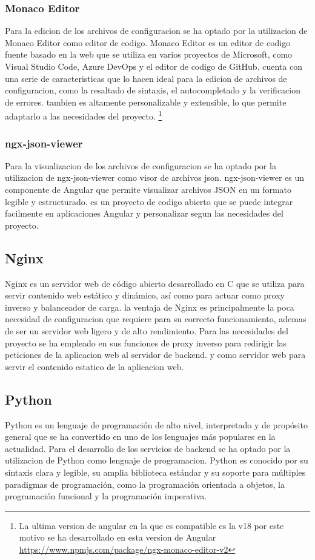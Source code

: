 \documentclass[12pt, a4paper, twoside]{article}
\begin{document}
\subsubsection{Monaco Editor}
\cite{monaco_editor} Para la edicion de los archivos de configuracion se ha optado por la utilizacion de Monaco Editor como editor de codigo.
Monaco Editor es un editor de codigo fuente basado en la web que se utiliza en varios proyectos de Microsoft, como Visual Studio Code, Azure DevOps y el editor de codigo de GitHub.
cuenta con una serie de caracteristicas que lo hacen ideal para la edicion de archivos de configuracion, como la resaltado de sintaxis, el autocompletado y la verificacion de errores.
tambien es altamente personalizable y extensible, lo que permite adaptarlo a las necesidades del proyecto. \footnote{La ultima version de angular en la que es compatible es la v18 por este motivo se ha desarrollado en esta version de Angular \href{https://www.npmjs.com/package/ngx-monaco-editor-v2}{https://www.npmjs.com/package/ngx-monaco-editor-v2}}
\subsubsection{ngx-json-viewer}
\cite{ngx_json_viewer}
Para la visualizacion de los archivos de configuracion se ha optado por la utilizacion de ngx-json-viewer como visor de archivos json.
ngx-json-viewer es un componente de Angular que permite visualizar archivos JSON en un formato legible y estructurado.
es un proyecto de codigo abierto que se puede integrar facilmente en aplicaciones Angular y personalizar segun las necesidades del proyecto.

\subsection{Nginx}
\cite{nginx} 
Nginx es un servidor web de código abierto desarrollado en C que se utiliza para servir contenido web estático y dinámico, así como para actuar como proxy inverso y balanceador de carga.
la ventaja de Nginx es principalmente la poca necesidad de configuracion que requiere para su correcto funcionamiento, ademas de ser un servidor web ligero y de alto rendimiento.
Para las necesidades del proyecto se ha empleado en sus funciones de proxy inverso para redirigir las peticiones de la aplicacion web al servidor de backend.
y como servidor web para servir el contenido estatico de la aplicacion web.

\subsection{Python}
\cite{python}
Python es un lenguaje de programación de alto nivel, interpretado y de propósito general que se ha convertido en uno de los lenguajes más populares en la actualidad.
Para el desarrollo de los servicios de backend se ha optado por la utilizacion de Python como lenguaje de programacion.
Python es conocido por su sintaxis clara y legible, su amplia biblioteca estándar y su soporte para múltiples paradigmas de programación, como la programación orientada a objetos, la programación funcional y la programación imperativa.
\end{document}
